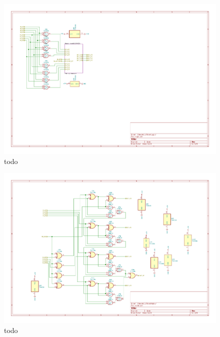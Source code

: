 \documentclass{article}
\begin{document}
    \begin{figure}[h!]
        \centering
        \includegraphics[width=.9\linewidth]{logic_sheet.pdf}
        \caption{todo}
    \end{figure}

    \begin{figure}[h!]
        \centering
        \includegraphics[width=.9\linewidth]{adder_sheet.pdf}
        \caption{todo}
    \end{figure}
\end{document}
